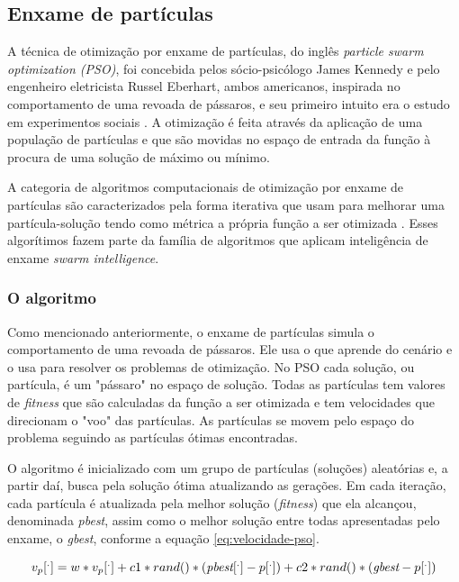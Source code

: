 \documentclass[a4paper,12pt]{article}
\begin{document}
\subsection{Enxame de partículas}

A técnica de otimização por enxame de partículas, do inglês \textit{particle swarm optimization (PSO)}, foi concebida pelos sócio-psicólogo James Kennedy e pelo engenheiro eletricista Russel Eberhart, ambos americanos, inspirada no comportamento de uma revoada de pássaros, e seu primeiro intuito era o estudo em experimentos sociais \cite{KennedyEberhart:1995}. A otimização é feita através da aplicação de uma população de partículas e que são movidas no espaço de entrada da função à procura de uma solução de máximo ou mínimo.

A categoria de algoritmos computacionais de otimização por enxame de partículas são caracterizados pela forma iterativa que usam para  melhorar uma partícula-solução tendo como métrica a própria função a ser otimizada \cite{Yang_etal:2013}. Esses algorítimos fazem parte da família de algoritmos que aplicam inteligência de enxame \emph{swarm intelligence}. 

\subsubsection{O algoritmo}

Como mencionado anteriormente, o enxame de partículas simula o comportamento de uma revoada de pássaros. Ele usa o que aprende do cenário e o usa para resolver os problemas de otimização. No PSO cada solução, ou partícula, é um "pássaro" no espaço de solução. Todas as partículas tem valores de \emph{fitness} que são calculadas da função a ser otimizada e tem velocidades que direcionam o "voo" das partículas. As partículas se movem pelo espaço do problema seguindo as partículas ótimas encontradas.

O algoritmo é inicializado com um grupo de partículas (soluções) aleatórias e, a partir daí, busca pela solução ótima atualizando as gerações. Em cada iteração, cada partícula é atualizada pela melhor solução (\emph{fitness}) que ela alcançou, denominada \emph{pbest}, assim como o melhor solução entre todas apresentadas pelo enxame, o \emph{gbest}, conforme a equação \ref{eq:velocidade-pso}.

\newpage
\begin{equation}
    v_p[^.] = w * v_p[^.] + c1 * rand() * (\emph{pbest}[^.] - p[^.]) + c2 * rand() * (\emph{gbest} - p[^.])
\label{eq:velocidade-pso}
\end{equation}
\end{document}
